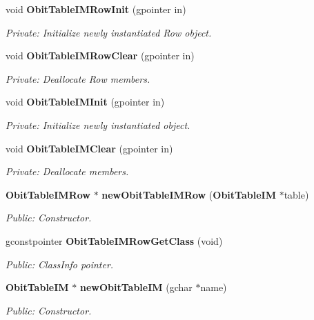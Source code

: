 \begin{CompactItemize}
\item 
void {\bf Obit\-Table\-IMRow\-Init} (gpointer in)
\begin{CompactList}\small\item\em Private: Initialize newly instantiated Row object. \item\end{CompactList}\item 
void {\bf Obit\-Table\-IMRow\-Clear} (gpointer in)
\begin{CompactList}\small\item\em Private: Deallocate Row members. \item\end{CompactList}\item 
void {\bf Obit\-Table\-IMInit} (gpointer in)
\begin{CompactList}\small\item\em Private: Initialize newly instantiated object. \item\end{CompactList}\item 
void {\bf Obit\-Table\-IMClear} (gpointer in)
\begin{CompactList}\small\item\em Private: Deallocate members. \item\end{CompactList}\item 
{\bf Obit\-Table\-IMRow} $\ast$ {\bf new\-Obit\-Table\-IMRow} ({\bf Obit\-Table\-IM} $\ast$table)
\begin{CompactList}\small\item\em Public: Constructor. \item\end{CompactList}\item 
gconstpointer {\bf Obit\-Table\-IMRow\-Get\-Class} (void)
\begin{CompactList}\small\item\em Public: Class\-Info pointer. \item\end{CompactList}\item 
{\bf Obit\-Table\-IM} $\ast$ {\bf new\-Obit\-Table\-IM} (gchar $\ast$name)
\begin{CompactList}\small\item\em Public: Constructor. \item\end{CompactList}\item 

\end{CompactItemize}
